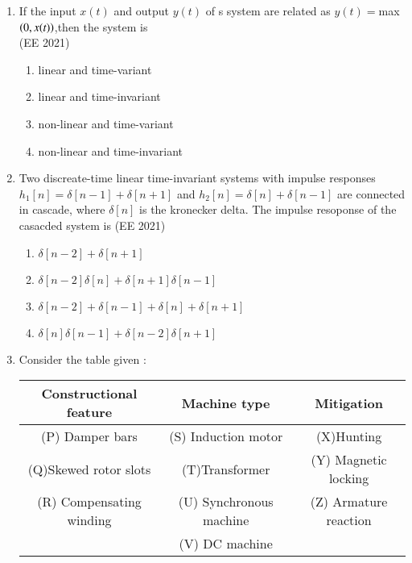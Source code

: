 \documentclass[journal,12pt,onecolumn]{IEEEtran}
\theoremstyle{remark}
\begin{document}
\begin{enumerate}
\item If the input $x(t)$ and output $y(t)$ of s system are related as $y(t)=$max$\left(0,x(t)\right)$,then the system is \\
\text{ } \hfill{(EE 2021)}

\begin{enumerate}
\item linear and time-variant
\item linear and time-invariant
\item non-linear and time-variant
\item non-linear and time-invariant
\end{enumerate}

\item Two discreate-time linear time-invariant systems with impulse responses $h_1[n]=\delta[n-1]+\delta[n+1]$ and $h_2[n]=\delta[n]+\delta[n-1]$ are connected in cascade, where $\delta[n]$ is the kronecker delta. The impulse resoponse of the casacded system is 
\hfill{(EE 2021)}
\begin{enumerate}
\item $\delta[n-2]+\delta[n+1]$
\item $\delta[n-2]\delta[n]+\delta[n+1]\delta[n-1]$
\item $\delta[n-2]+\delta[n-1]+\delta[n]+\delta[n+1]$
\item $\delta[n]\delta[n-1]+\delta[n-2]\delta[n+1]$
\end{enumerate}
\item Consider the table given :
\begin{table}[h!]    
  \centering
\begin{tabular}[12pt]{ |c| c| c|}
    \hline
    \textbf{Constructional feature} & \textbf{Machine type} & \textbf{Mitigation}  \\ 
    \hline
    (P) Damper bars & (S) Induction motor & (X)Hunting\\
    \hline
    (Q)Skewed rotor slots & (T)Transformer & (Y) Magnetic locking \\   
    \hline
    (R) Compensating winding & (U) Synchronous machine & (Z) Armature reaction \\
    \hline
      & (V) DC machine & \\
    \hline
    \end{tabular}
\end{table}



\end{enumerate}
\end{document}
